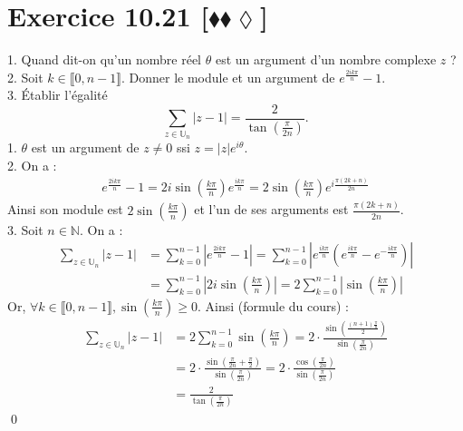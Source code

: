\documentclass[10pt]{article}
\begin{document}
\section*{Exercice 10.21 [$\blacklozenge\blacklozenge\lozenge$]}
\begin{tcolorbox}[enhanced, width=7in, center, size=fbox, fontupper=\large, drop shadow southwest]
    1. Quand dit-on qu'un nombre réel $\theta$ est un argument d'un nombre complexe $z$ ?\\
    2. Soit $k\in\llbracket0,n-1\rrbracket$. Donner le module et un argument de $e^{\frac{2ik\pi}{n}}-1$.\\
    3. Établir l'égalité
    \begin{equation*}
        \sum_{z\in\mathbb{U}_n}{|z-1|}=\frac{2}{\tan\left( \frac{\pi}{2n} \right)}.
    \end{equation*}
    1. $\theta$ est un argument de $z\neq0$ ssi $z=|z|e^{i\theta}$.\\
    2. On a :
    \begin{align*}
        e^{\frac{2ik\pi}{n}}-1=2i\sin\left( \frac{k\pi}{n} \right)e^{\frac{ik\pi}{n}}=2\sin\left( \frac{k\pi}{n} \right)e^{i\frac{\pi(2k+n)}{2n}}
    \end{align*}
    Ainsi son module est $2\sin\left( \frac{k\pi}{n} \right)$ et l'un de ses arguments est $\frac{\pi(2k+n)}{2n}$.\\
    3. Soit $n\in\mathbb{N}$. On a :
    \begin{align*}
        \sum_{z\in\mathbb{U}_n}{|z-1|}&=\sum_{k=0}^{n-1}{|e^{\frac{2ik\pi}{n}}-1|} = \sum_{k=0}^{n-1}{|e^{\frac{ik\pi}{n}}\left( e^{\frac{ik\pi}{n}} - e^{-\frac{ik\pi}{n}} \right)|}\\
        &=\sum_{k=0}^{n-1}{\left|2i\sin\left( \frac{k\pi}{n} \right)\right|} = 2\sum_{k=0}^{n-1}{\left|\sin\left( \frac{k\pi}{n} \right)\right|}
    \end{align*}
    Or, $\forall{k\in\llbracket0,n-1\rrbracket}, \sin\left( \frac{k\pi}{n} \right) \geq 0$. Ainsi (formule du cours) :
    \begin{align*}
        \sum_{z\in\mathbb{U}_n}{|z-1|} &= 2\sum_{k=0}^{n-1}{\sin\left( \frac{k\pi}{n} \right)} = 2 \cdot \frac{ \sin \left( \frac{(n+1) \frac{\pi}{n}}{2} \right)}{\sin \left( \frac{\pi}{2n} \right)}\\
        &= 2 \cdot \frac{\sin\left( \frac{\pi}{2n} + \frac{\pi}{2} \right)}{\sin \left( \frac{\pi}{2n} \right)} = 2 \cdot \frac{\cos\left( \frac{\pi}{2n} \right)}{\sin\left( \frac{\pi}{2n} \right)}\\
        &= \frac{2}{\tan\left( \frac{\pi}{2n} \right)}
    \end{align*}
    \qed
\end{tcolorbox}
\end{document}
